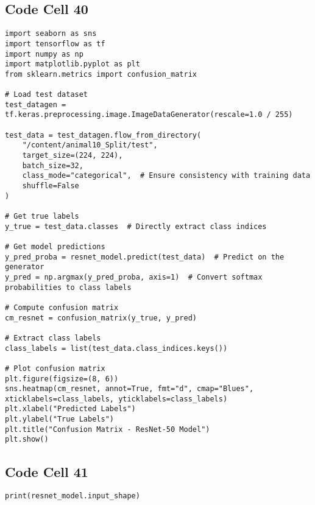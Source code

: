 \documentclass{article}
\begin{document}
\subsection*{Code Cell 40}
\begin{lstlisting}
import seaborn as sns
import tensorflow as tf
import numpy as np
import matplotlib.pyplot as plt
from sklearn.metrics import confusion_matrix

# Load test dataset
test_datagen = tf.keras.preprocessing.image.ImageDataGenerator(rescale=1.0 / 255)

test_data = test_datagen.flow_from_directory(
    "/content/animal10_Split/test",
    target_size=(224, 224),
    batch_size=32,
    class_mode="categorical",  # Ensure consistency with training data
    shuffle=False
)

# Get true labels
y_true = test_data.classes  # Directly extract class indices

# Get model predictions
y_pred_proba = resnet_model.predict(test_data)  # Predict on the generator
y_pred = np.argmax(y_pred_proba, axis=1)  # Convert softmax probabilities to class labels

# Compute confusion matrix
cm_resnet = confusion_matrix(y_true, y_pred)

# Extract class labels
class_labels = list(test_data.class_indices.keys())

# Plot confusion matrix
plt.figure(figsize=(8, 6))
sns.heatmap(cm_resnet, annot=True, fmt="d", cmap="Blues", xticklabels=class_labels, yticklabels=class_labels)
plt.xlabel("Predicted Labels")
plt.ylabel("True Labels")
plt.title("Confusion Matrix - ResNet-50 Model")
plt.show()
\end{lstlisting}

\subsection*{Code Cell 41}
\begin{lstlisting}
print(resnet_model.input_shape)
\end{lstlisting}
\end{document}
